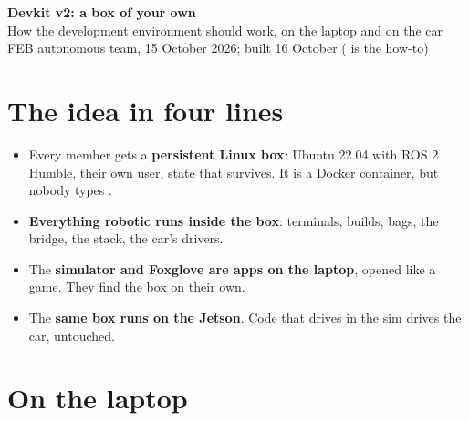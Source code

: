 \documentclass[11pt,a4paper]{article}
\begin{document}
\pagestyle{fancy}

\begin{center}
  {\color{febblue}\LARGE\bfseries Devkit v2: a box of your own}\\[4pt]
  {\large How the development environment should work, on the laptop and on the car}\\[4pt]
  FEB autonomous team, 15 October 2026; built 16 October ( is the how-to)
\end{center}
\medskip

\section*{The idea in four lines}
\begin{itemize}
  \item Every member gets a \textbf{persistent Linux box}: Ubuntu 22.04 with ROS 2 Humble, their own user, state that survives. It is a Docker container, but nobody types .
  \item \textbf{Everything robotic runs inside the box}: terminals, builds, bags, the bridge, the stack, the car's drivers.
  \item The \textbf{simulator and Foxglove are apps on the laptop}, opened like a game. They find the box on their own.
  \item The \textbf{same box runs on the Jetson}. Code that drives in the sim drives the car, untouched.
\end{itemize}

\section{On the laptop}
\end{document}
